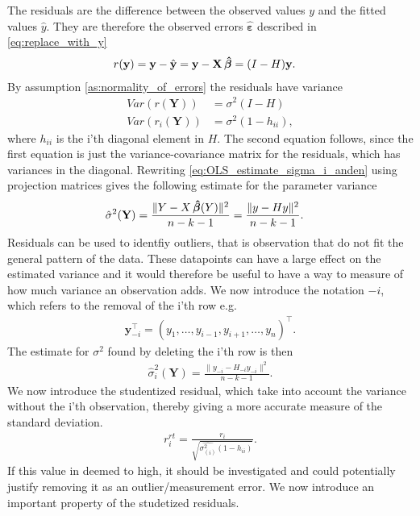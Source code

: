 The residuals are the difference between the observed values $y$ and the fitted values $\hat{y}$. They are therefore the observed errors $\boldsymbol{\hat{\varepsilon}}$ described in \eqref{eq:replace_with_y}
\begin{align*}
    r(\textbf{y}) &= \textbf{y} - \hat{\textbf{y}} = \textbf{y} - \textbf{X} \operatorname{\boldsymbol{\hat{\beta}}} = (I - H) \textbf{y}.
\end{align*}
By assumption \ref{as:normality_of_errors} the residuals have variance
\begin{align*}
    Var(r(\textbf{Y})) &= \sigma^2 (I - H) \\
    Var(r_i(\textbf{Y})) &= \sigma^2(1 - h_{ii}),
\end{align*}
where $h_{ii}$ is the i'th diagonal element in $H$. The second equation follows, since the first equation is just the variance-covariance matrix for the residuals, which has variances in the diagonal.
Rewriting \eqref{eq:OLS_estimate_sigma_i_anden} using projection matrices gives the following estimate for the parameter variance
\begin{align*}
    \hat{\sigma}^2(\textbf{Y}) &= \frac{\| Y - X \operatorname{\boldsymbol{\hat{\beta}}} (Y) \|^2 }{n-k-1} = \frac{\| y - H y \|^2}{n-k-1} .
\end{align*}
Residuals can be used to identfiy outliers, that is observation that do not fit the general pattern of the data.
These datapoints can have a large effect on the estimated variance and it would therefore be useful to have a way to measure of how much variance an observation adds.
We now introduce the notation $-i$, which refers to the removal of the i'th row e.g.
\begin{align*}
    \textbf{y}_{-i}^\top = (y_1, \ldots, y_{i-1}, y_{i+1}, \ldots, y_n)^\top.
\end{align*}
The estimate for $\sigma^2$ found by deleting the i'th row is then
\begin{align*}
    \hat{\sigma}^2_i(\textbf{Y}) = \frac{\| y_{-i} - H_{-i} y_{-i} \|^2}{n-k-1}.
\end{align*}
We now introduce the studentized residual, which take into account the variance without the i'th observation, thereby giving a more accurate measure of the standard deviation. 
\begin{align*}
    r_i^{rt} = \frac{r_i}{\sqrt{\hat{\sigma^2_{(i)}}(1-h_{ii})}}.
\end{align*}
If this value in deemed to high, it should be investigated and could potentially justify removing it as an outlier/measurement error. We now introduce an important property of the studetized residuals.


